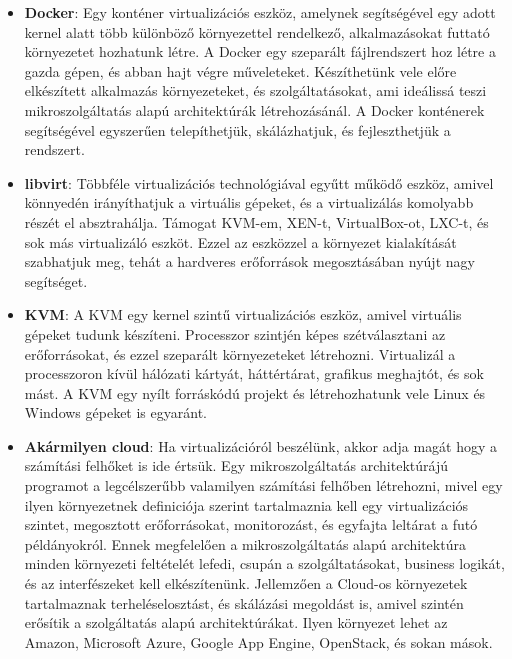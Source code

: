 \documentclass[11pt,magyar,a4paper,twoside,]{report}
\begin{document}
\begin{itemize}
\item
  \textbf{Docker}\citep{docker}: Egy konténer virtualizációs eszköz,
  amelynek segítségével egy adott kernel alatt több különböző
  környezettel rendelkező, alkalmazásokat futtató környezetet hozhatunk
  létre. A Docker egy szeparált fájlrendszert hoz létre a gazda gépen,
  és abban hajt végre műveleteket. Készíthetünk vele előre elkészített
  alkalmazás környezeteket, és szolgáltatásokat, ami ideálissá teszi
  mikroszolgáltatás alapú architektúrák létrehozásánál. A Docker
  konténerek segítségével egyszerűen telepíthetjük, skálázhatjuk, és
  fejleszthetjük a rendszert.
\item
  \textbf{libvirt}\citep{libvirt}: Többféle virtualizációs
  technológiával egyűtt működő eszköz, amivel könnyedén irányíthatjuk a
  virtuális gépeket, és a virtualizálás komolyabb részét el
  absztrahálja. Támogat KVM-em, XEN-t, VirtualBox-ot, LXC-t, és sok más
  virtualizáló eszköt. Ezzel az eszközzel a környezet kialakítását
  szabhatjuk meg, tehát a hardveres erőforrások megosztásában nyújt nagy
  segítséget.
\item
  \textbf{KVM}\citep{kvm}: A KVM egy kernel szintű virtualizációs
  eszköz, amivel virtuális gépeket tudunk készíteni. Processzor szintjén
  képes szétválasztani az erőforrásokat, és ezzel szeparált
  környezeteket létrehozni. Virtualizál a processzoron kívül hálózati
  kártyát, háttértárat, grafikus meghajtót, és sok mást. A KVM egy nyílt
  forráskódú projekt és létrehozhatunk vele Linux és Windows gépeket is
  egyaránt.
\item
  \textbf{Akármilyen cloud}: Ha virtualizációról beszélünk, akkor adja
  magát hogy a számítási felhőket is ide értsük. Egy mikroszolgáltatás
  architektúrájú programot a legcélszerűbb valamilyen számítási felhőben
  létrehozni, mivel egy ilyen környezetnek definiciója szerint
  tartalmaznia kell egy virtualizációs szintet, megosztott
  erőforrásokat, monitorozást, és egyfajta leltárat a futó példányokról.
  Ennek megfelelően a mikroszolgáltatás alapú architektúra minden
  környezeti feltételét lefedi, csupán a szolgáltatásokat, business
  logikát, és az interfészeket kell elkészítenünk. Jellemzően a Cloud-os
  környezetek tartalmaznak terheléselosztást, és skálázási megoldást is,
  amivel szintén erősítik a szolgáltatás alapú architektúrákat. Ilyen
  környezet lehet az Amazon, Microsoft Azure, Google App Engine,
  OpenStack, és sokan mások.
\end{itemize}
\end{document}
